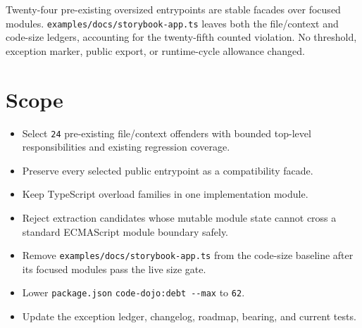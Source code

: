 Twenty-four pre-existing oversized entrypoints are stable facades over focused modules. \texttt{e\allowbreak{}x\allowbreak{}a\allowbreak{}m\allowbreak{}p\allowbreak{}l\allowbreak{}e\allowbreak{}s\allowbreak{}/\allowbreak{}d\allowbreak{}o\allowbreak{}c\allowbreak{}s\allowbreak{}/\allowbreak{}s\allowbreak{}t\allowbreak{}o\allowbreak{}r\allowbreak{}y\allowbreak{}b\allowbreak{}o\allowbreak{}o\allowbreak{}k\allowbreak{}-\allowbreak{}a\allowbreak{}p\allowbreak{}p\allowbreak{}.\allowbreak{}t\allowbreak{}s} leaves both the file/context and code-size ledgers, accounting for the twenty-fifth counted violation. No threshold, exception marker, public export, or runtime-cycle allowance changed.

\section{Scope}\label{record-246-scope}

\begin{itemize}
\tightlist
\item
  Select \texttt{2\allowbreak{}4} pre-existing file/context offenders with bounded top-level responsibilities and existing regression coverage.
\item
  Preserve every selected public entrypoint as a compatibility facade.
\item
  Keep TypeScript overload families in one implementation module.
\item
  Reject extraction candidates whose mutable module state cannot cross a standard ECMAScript module boundary safely.
\item
  Remove \texttt{e\allowbreak{}x\allowbreak{}a\allowbreak{}m\allowbreak{}p\allowbreak{}l\allowbreak{}e\allowbreak{}s\allowbreak{}/\allowbreak{}d\allowbreak{}o\allowbreak{}c\allowbreak{}s\allowbreak{}/\allowbreak{}s\allowbreak{}t\allowbreak{}o\allowbreak{}r\allowbreak{}y\allowbreak{}b\allowbreak{}o\allowbreak{}o\allowbreak{}k\allowbreak{}-\allowbreak{}a\allowbreak{}p\allowbreak{}p\allowbreak{}.\allowbreak{}t\allowbreak{}s} from the code-size baseline after its focused modules pass the live size gate.
\item
  Lower \texttt{p\allowbreak{}a\allowbreak{}c\allowbreak{}k\allowbreak{}a\allowbreak{}g\allowbreak{}e\allowbreak{}.\allowbreak{}j\allowbreak{}s\allowbreak{}o\allowbreak{}n} \texttt{c\allowbreak{}o\allowbreak{}d\allowbreak{}e\allowbreak{}-\allowbreak{}d\allowbreak{}o\allowbreak{}j\allowbreak{}o\allowbreak{}:\allowbreak{}d\allowbreak{}e\allowbreak{}b\allowbreak{}t\allowbreak{} \allowbreak{}-\allowbreak{}-\allowbreak{}m\allowbreak{}a\allowbreak{}x} to \texttt{6\allowbreak{}2}.
\item
  Update the exception ledger, changelog, roadmap, bearing, and current tests.
\end{itemize}

